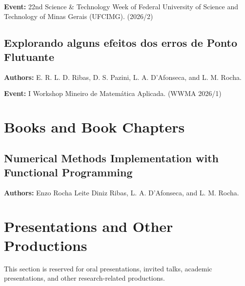 \textbf{Event:} 22nd Science \& Technology Week of Federal University of Science and Technology of Minas Gerais (UFCIMG). (2026/2)

\subsection*{Explorando alguns efeitos dos erros de Ponto Flutuante}

\textbf{Authors:} E. R. L. D. Ribas, D. S. Pazini, L. A. D'Afonseca, and
L. M. Rocha.

\textbf{Event:} I Workshop Mineiro de Matemática Aplicada. (WWMA 2026/1)

\section{Books and Book Chapters}

\subsection*{Numerical Methods Implementation with Functional Programming}

\textbf{Authors:} Enzo Rocha Leite Diniz Ribas, L. A. D'Afonseca, and L. M. Rocha.

\section{Presentations and Other Productions}

This section is reserved for oral presentations, invited talks, academic
presentations, and other research-related productions.